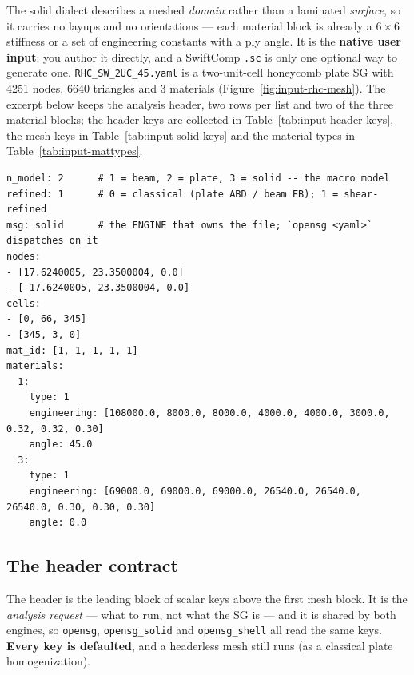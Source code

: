 The solid dialect describes a meshed \emph{domain} rather than a laminated
\emph{surface}, so it carries no layups and no orientations --- each material
block is already a $6\times6$ stiffness or a set of engineering constants with
a ply angle. It is the \textbf{native user input}: you author it directly, and
a SwiftComp \texttt{.sc} is only one optional way to generate one.
\texttt{RHC\_SW\_2UC\_45.yaml} is a two-unit-cell honeycomb plate SG with 4251
nodes, 6640 triangles and 3 materials (Figure~\ref{fig:input-rhc-mesh}). The
excerpt below keeps the analysis header, two rows per list and two of the three
material blocks; the header keys are collected in
Table~\ref{tab:input-header-keys}, the mesh keys in
Table~\ref{tab:input-solid-keys} and the material types in
Table~\ref{tab:input-mattypes}.

\begin{lstlisting}[style=shellst,caption={Abridged RHC\_SW\_2UC\_45.yaml. The leading scalar keys are the analysis request; the mesh blocks follow.}]
n_model: 2      # 1 = beam, 2 = plate, 3 = solid -- the macro model
refined: 1      # 0 = classical (plate ABD / beam EB); 1 = shear-refined
msg: solid      # the ENGINE that owns the file; `opensg <yaml>` dispatches on it
nodes:
- [17.6240005, 23.3500004, 0.0]
- [-17.6240005, 23.3500004, 0.0]
cells:
- [0, 66, 345]
- [345, 3, 0]
mat_id: [1, 1, 1, 1, 1]
materials:
  1:
    type: 1
    engineering: [108000.0, 8000.0, 8000.0, 4000.0, 4000.0, 3000.0, 0.32, 0.32, 0.30]
    angle: 45.0
  3:
    type: 1
    engineering: [69000.0, 69000.0, 69000.0, 26540.0, 26540.0, 26540.0, 0.30, 0.30, 0.30]
    angle: 0.0
\end{lstlisting}

\subsection{The header contract}
\label{sec:input-header}

The header is the leading block of scalar keys above the first mesh block. It
is the \emph{analysis request} --- what to run, not what the SG is --- and it
is shared by both engines, so \texttt{opensg}, \texttt{opensg\_solid} and
\texttt{opensg\_shell} all read the same keys.
\textbf{Every key is defaulted}, and a headerless mesh still runs (as a
classical plate homogenization).

